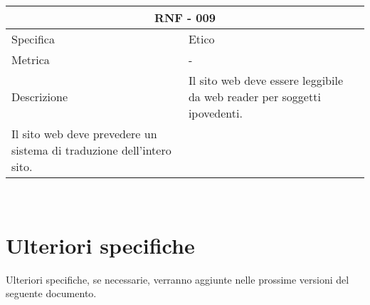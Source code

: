 \documentclass{article}
\begin{document}
\vspace{4mm} 
\begin{tabular}{ |p{3cm}|p{8cm}|  }
	\hline
	\multicolumn{2}{|c|}{\textbf{RNF - 009}} \\
	\hline
	Specifica&Etico \\
	\hline
	Metrica &  -\\
	\hline
	Descrizione&Il sito web deve essere leggibile da web reader per soggetti ipovedenti.\\ Il sito web deve prevedere un sistema di traduzione dell'intero sito.\\
	\hline
\end{tabular}\\

\section{\textbf{Ulteriori specifiche}}
Ulteriori specifiche, se necessarie, verranno aggiunte nelle prossime versioni del seguente documento.
\end{document}
